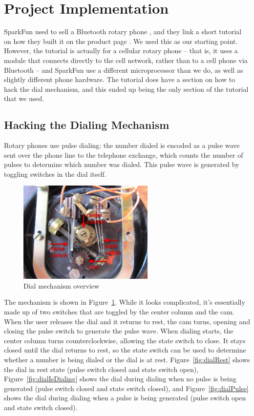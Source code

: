 \documentclass{es50report}
\begin{document}
    \section{Project Implementation}
    SparkFun used to sell a Bluetooth rotary phone \cite{sparkfun14}, and they link a short tutorial on how they built it on the product page \cite{seidle05}. We used this as our starting point. However, the tutorial is actually for a cellular rotary phone -- that is, it uses a module that connects directly to the cell network, rather than to a cell phone via Bluetooth -- and SparkFun use a different microprocessor than we do, as well as slightly different phone hardware. The tutorial does have a section on how to hack the dial mechanism, and this ended up being the only section of the tutorial that we used.

    \subsection{Hacking the Dialing Mechanism}
    Rotary phones use pulse dialing: the number dialed is encoded as a pulse wave sent over the phone line to the telephone exchange, which counts the number of pulses to determine which number was dialed. This pulse wave is generated by toggling switches in the dial itself.

    \begin{figure}
        \centering
        \includegraphics[width=0.6\textwidth, clip=true, trim=200 50 200 70]{images/small/dialOverview}
        \caption{Dial mechanism overview}\label{fig:dialOverview}
    \end{figure}

    The mechanism is shown in Figure~\ref{fig:dialOverview}. While it looks complicated, it's essentially made up of two switches that are toggled by the center column and the cam. When the user releases the dial and it returns to rest, the cam turns, opening and closing the pulse switch to generate the pulse wave. When dialing starts, the center column turns counterclockwise, allowing the state switch to close. It stays closed until the dial returns to rest, so the state switch can be used to determine whether a number is being dialed or the dial is at rest. Figure~\ref{fig:dialRest} shows the dial in rest state (pulse switch closed and state switch open), Figure~\ref{fig:dialIsDialing} shows the dial during dialing when no pulse is being generated (pulse switch closed and state switch closed), and Figure~\ref{fig:dialPulse} shows the dial during dialing when a pulse is being generated (pulse switch open and state switch closed).
\end{document}
